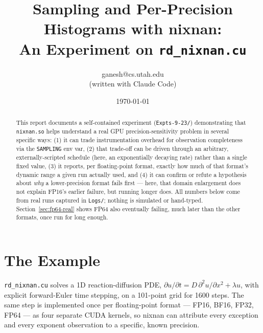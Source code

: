 \documentclass[11pt]{article}
\title{Sampling and Per-Precision Histograms with nixnan:\\
An Experiment on \texttt{rd\_nixnan.cu}}
\author{ganesh@cs.utah.edu \\ \small (written with Claude Code)}
\date{\today}
\begin{document}
\maketitle

\begin{abstract}
This report documents a self-contained experiment (\texttt{Expts-9-23/}) demonstrating
that \texttt{nixnan.so} helps understand a real GPU precision-sensitivity problem in
several specific ways: (1) it can trade instrumentation overhead for observation
completeness via the \texttt{SAMPLING} env var, (2) that trade-off can be driven through
an arbitrary, externally-scripted schedule (here, an exponentially decaying rate) rather
than a single fixed value, (3) it reports, per floating-point format, exactly how much of
that format's dynamic range a given run actually used, and (4) it can confirm or refute a
hypothesis about \emph{why} a lower-precision format fails first --- here, that domain
enlargement does not explain FP16's earlier failure, but running longer does. All numbers
below come from real runs captured in \texttt{Logs/}; nothing is simulated or hand-typed.
Section~\ref{sec:fp64-real} shows FP64 also eventually failing, much later than the other
formats, once run for long enough.
\end{abstract}

\tableofcontents

\section{The Example}

\texttt{rd\_nixnan.cu} solves a 1D reaction-diffusion PDE,
$\partial u/\partial t = D\,\partial^2 u/\partial x^2 + \lambda u$, with explicit
forward-Euler time stepping, on a 101-point grid for 1600 steps. The same step is
implemented once per floating-point format --- FP16, BF16, FP32, FP64 --- as four
separate CUDA kernels, so nixnan can attribute every exception and every exponent
observation to a specific, known precision.
\end{document}

